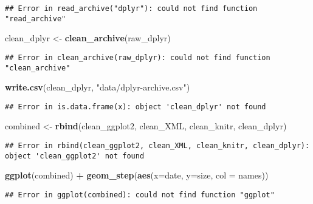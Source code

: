 \documentclass[]{article}
\newenvironment{Shaded}{\begin{snugshade}}{\end{snugshade}}
\newcommand{\KeywordTok}[1]{\textcolor[rgb]{0.13,0.29,0.53}{\textbf{#1}}}
\newcommand{\DataTypeTok}[1]{\textcolor[rgb]{0.13,0.29,0.53}{#1}}
\newcommand{\StringTok}[1]{\textcolor[rgb]{0.31,0.60,0.02}{#1}}
\newcommand{\OperatorTok}[1]{\textcolor[rgb]{0.81,0.36,0.00}{\textbf{#1}}}
\newcommand{\NormalTok}[1]{#1}
\begin{document}
\begin{verbatim}
## Error in read_archive("dplyr"): could not find function "read_archive"
\end{verbatim}

\begin{Shaded}
\begin{Highlighting}[]
\NormalTok{clean_dplyr <-}\StringTok{ }\KeywordTok{clean_archive}\NormalTok{(raw_dplyr)}
\end{Highlighting}
\end{Shaded}

\begin{verbatim}
## Error in clean_archive(raw_dplyr): could not find function "clean_archive"
\end{verbatim}

\begin{Shaded}
\begin{Highlighting}[]
\KeywordTok{write.csv}\NormalTok{(clean_dplyr, }\StringTok{"data/dplyr-archive.csv"}\NormalTok{)}
\end{Highlighting}
\end{Shaded}

\begin{verbatim}
## Error in is.data.frame(x): object 'clean_dplyr' not found
\end{verbatim}

\begin{Shaded}
\begin{Highlighting}[]
\NormalTok{combined <-}\StringTok{ }\KeywordTok{rbind}\NormalTok{(clean_ggplot2, clean_XML, clean_knitr, clean_dplyr)}
\end{Highlighting}
\end{Shaded}

\begin{verbatim}
## Error in rbind(clean_ggplot2, clean_XML, clean_knitr, clean_dplyr): object 'clean_ggplot2' not found
\end{verbatim}

\begin{Shaded}
\begin{Highlighting}[]
\KeywordTok{ggplot}\NormalTok{(combined) }\OperatorTok{+}\StringTok{ }\KeywordTok{geom_step}\NormalTok{(}\KeywordTok{aes}\NormalTok{(}\DataTypeTok{x=}\NormalTok{date, }\DataTypeTok{y=}\NormalTok{size, }\DataTypeTok{col =}\NormalTok{ names))}
\end{Highlighting}
\end{Shaded}

\begin{verbatim}
## Error in ggplot(combined): could not find function "ggplot"
\end{verbatim}
\end{document}
